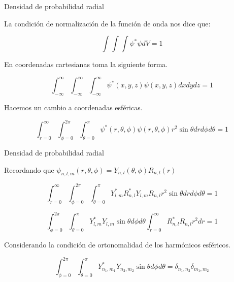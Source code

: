 \begin{frame}{Densidad de probabilidad radial}

    La condición de normalización de la función de onda nos dice que:

    \begin{equation}
        \int \int \int \psi^{*} \psi dV = 1
    \end{equation}

    En coordenadas cartesianas toma la siguiente forma.

    \begin{equation}
        \displaystyle\int_{-\infty}^{\infty} 
        \displaystyle\int_{-\infty}^{\infty} 
        \displaystyle\int_{-\infty}^{\infty} 
        \psi^{*}(x,y,z) \psi(x,y,z) dxdydz = 1
    \end{equation}

    Hacemos un cambio a coordenadas esféricas.

    \begin{equation}
        \displaystyle\int_{r=0}^{\infty} 
        \displaystyle\int_{\phi=0}^{2\pi} 
        \displaystyle\int_{\theta=0}^{\pi} 
        \psi^{*}(r,\theta,\phi) \psi(r,\theta,\phi) 
        r^2 \sin{\theta} dr d\phi d\theta = 1
    \end{equation}

\end{frame}

\begin{frame}{Densidad de probabilidad radial}

    Recordando que $\psi_{n,l,m} (r, \theta, \phi) = Y_{n,l}(\theta,\phi) R_{n,l} (r) $

    \begin{equation}
        \displaystyle\int_{r=0}^{\infty} 
        \displaystyle\int_{\phi=0}^{2\pi} 
        \displaystyle\int_{\theta=0}^{\pi} 
        Y^{*}_{l,m} R_{n,l}^{*}
        Y_{l,m} R_{n,l}
        r^2 \sin{\theta} dr d\phi d\theta = 1
    \end{equation}

    \begin{equation}
        \displaystyle\int_{\phi=0}^{2\pi} 
        \displaystyle\int_{\theta=0}^{\pi} 
        Y^{*}_{l,m} Y_{l,m}
        \sin{\theta} d\phi d\theta
        \displaystyle\int_{r=0}^{\infty} 
        R_{n,l}^{*} R_{n,l}
        r^2  dr  = 1
    \end{equation}

    Considerando la condición de ortonomalidad de los harmónicos esféricos. \cite{arfken1999mathematical}

    \begin{equation}
        \displaystyle\int_{\phi=0}^{2\pi} 
        \displaystyle\int_{\theta=0}^{\pi} 
        Y^{*}_{n_1,m_1} Y_{n_2,m_2}
        \sin{\theta} d\phi d\theta
        = 
        \delta_{n_1 , n_2} \delta_{m_1 , m_2}
    \end{equation}

\end{frame}


